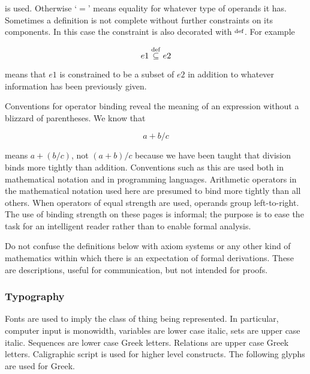 \noindent is used.  Otherwise `$=$' means equality for whatever type of 
operands it has.  Sometimes a definition is not complete without further 
constraints on its components.  In this case the constraint is also 
decorated with $\stackrel{\rm def}{}$.
For example

\begin{displaymath}
e1 \stackrel{\rm def}{\subseteq} e2
\end{displaymath}

\noindent means that $e1$ is constrained to be a subset of $e2$ in 
addition to whatever information has been previously given.

Conventions for operator binding reveal the meaning of an expression 
without a blizzard of parentheses.  We know that

\begin{displaymath}
a+b/c
\end{displaymath}

\noindent
means $a+(b/c)$, not $(a+b)/c$ because we have been taught that division 
binds more tightly than addition.  
Conventions such as this are used both in mathematical notation and in 
programming languages.  Arithmetic operators in the mathematical notation 
used here are presumed to bind more tightly than all others.  
When operators of equal strength are used, operands group left-to-right.  
The use of binding strength on these pages is informal; 
the purpose is to ease the task for an intelligent reader rather 
than to enable formal analysis.

Do not confuse the definitions below with axiom systems or any other kind 
of mathematics within which there is an expectation of formal derivations.  
These are descriptions, useful for communication, but not intended for 
proofs.

\subsubsection{Typography}

Fonts are used to imply the class of thing being represented.  
In particular, computer input is monowidth, variables are lower case italic, 
sets are upper case italic.  
Sequences are lower case Greek letters.  
Relations are upper case Greek letters.  
Caligraphic script is used for higher level constructs.  
The following glyphs are used for Greek.

